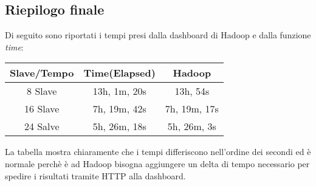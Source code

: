 \subsection{Riepilogo finale}
Di seguito sono riportati i tempi presi dalla dashboard di Hadoop e dalla funzione \textit{time}:
\begin{tabular}{|c|c|c|}
\hline 
Slave/Tempo & Time(Elapsed) & Hadoop \\ 
\hline 
8 Slave & 13h, 1m, 20s & 13h, 54s \\ 
\hline 
16 Slave & 7h, 19m, 42s & 7h, 19m, 17s \\ 
\hline 
24 Salve & 5h, 26m, 18s & 5h, 26m, 3s \\ 
\hline 
\end{tabular} 
La tabella mostra chiaramente che i tempi differiscono nell'ordine dei secondi ed è normale perchè è ad Hadoop bisogna aggiungere un delta di tempo necessario per spedire i risultati tramite HTTP alla dashboard.